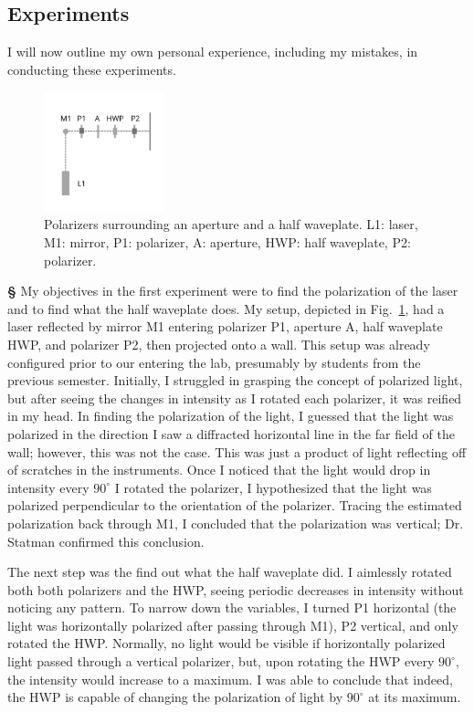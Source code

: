 \documentclass[12pt]{article}
\begin{document}
\subsection*{Experiments}
I will now outline my own personal experience, including my mistakes, in conducting these experiments.

\noindent
\begin{figure}
  \begin{center}
    \includegraphics[width=0.31\textwidth]{E1}
  \end{center}
  \caption{Polarizers surrounding an aperture and a half waveplate. L1: laser, M1: mirror, P1: polarizer, A: aperture, HWP: half waveplate, P2: polarizer.}\label{E1}
\end{figure}
\large{\textbf{\S}}
My objectives in the first experiment were to find the polarization of the laser and to find what the half waveplate does. My setup, depicted in Fig.~\ref{E1}, had a laser reflected by mirror M1 entering polarizer P1, aperture A, half waveplate HWP, and polarizer P2, then projected onto a wall. This setup was already configured prior to our entering the lab, presumably by students from the previous semester. Initially, I struggled in grasping the concept of polarized light, but after seeing the changes in intensity as I rotated each polarizer, it was reified in my head. In finding the polarization of the light, I guessed that the light was polarized in the direction I saw a diffracted horizontal line in the far field of the wall; however, this was not the case. This was just a product of light reflecting off of scratches in the instruments. Once I noticed that the light would drop in intensity every $90^{\circ}$ I rotated the polarizer, I hypothesized that the light was polarized perpendicular to the orientation of the polarizer. Tracing the estimated polarization back through M1, I concluded that the polarization was vertical; Dr. Statman confirmed this conclusion.

The next step was the find out what the half waveplate did. I aimlessly rotated both both polarizers and the HWP, seeing periodic decreases in intensity without noticing any pattern. To narrow down the variables, I turned P1 horizontal (the light was horizontally polarized after passing through M1), P2 vertical, and only rotated the HWP. Normally, no light would be visible if horizontally polarized light passed through a vertical polarizer, but, upon rotating the HWP every $90^{\circ}$, the intensity would increase to a maximum. I was able to conclude that indeed, the HWP is capable of changing the polarization of light by $90^{\circ}$ at its maximum.
\end{document}
